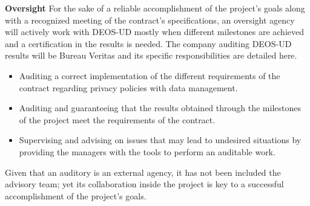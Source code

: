 \textbf{Oversight }
\newline
\newline
For the sake of a reliable accomplishment of the project’s goals along with a recognized meeting of the contract’s specifications, an oversight agency will actively work with DEOS-UD mostly when different milestones are achieved and a certification in the results is needed. The company auditing DEOS-UD results will be Bureau Veritas and its specific responsibilities are detailed here.
 \begin{itemize}
	\item 	Auditing a correct implementation of the different requirements of the contract regarding privacy policies with data management. 
	\item Auditing and guaranteeing that the results obtained through the milestones of the project meet the requirements of the contract.
	\item 	Supervising and advising on issues that may lead to undesired situations by providing the managers with the tools to perform an auditable work. 
	 
\end{itemize}
Given that an auditory is an external agency, it has not been included the advisory team; yet its collaboration inside the project is key to a successful accomplishment of the project’s goals. 
